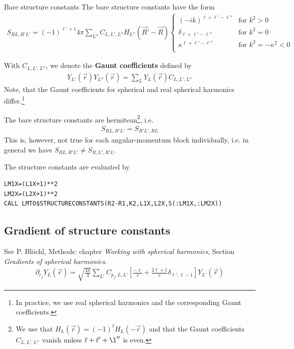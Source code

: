 \documentclass[11pt,a4paper]{report}
\begin{document}
\begin{myshadowminipage}{Bare structure constants}
The bare structure constants have the form
\begin{eqnarray}
S_{RL,R'L'}=(-1)^{\ell'+1} 4\pi \sum_{L''} C_{L,L',L''} 
H_{L''}(\vec{R}'-\vec{R})
\begin{cases}
(-ik)^{\ell+\ell'-\ell''}&\text{for $k^2>0$}\\
\delta_{\ell+\ell'-\ell''}&\text{for $k^2=0$}\\
\kappa^{\ell+\ell'-\ell''}&\text{for $k^2=-\kappa^2<0$}\\
\end{cases}
\label{eq:fortmulaforbarestructureconstants}
\end{eqnarray}
\end{myshadowminipage}

With $C_{L,L',L''}$, we denote the \textbf{Gaunt
  coefficients} defined by
\begin{eqnarray}
Y_{L'}(\vec{r})Y_{L''}(\vec{r})=\sum_L Y_{L}(\vec{r})C_{L,L',L''}
\end{eqnarray}
Note, that the Gaunt coefficients for spherical and real spherical
harmonics differ.\footnote{In practice, we use real spherical
  harmonics and the corresponding Gaunt coefficients.}

The bare structure constants are hermitean\footnote{We use that
  $H_L(\vec{r})=(-1)^\ell H_L(-\vec{r})$ and that the Gaunt
  coefficients $C_{L,L',L''}$ vanish unless $\ell+\ell'+\l''$ is
  even.}, i.e.
\begin{eqnarray}
S_{RL,R'L'}=S_{R'L',RL}
\end{eqnarray}
This is, however, not true for each angular-momentum block individually,
i.e. in general we have $S_{RL,R'L'}\neq S_{R,L',R'L}$.

The structure constants are evaluated by
\begin{verbatim}
LM1X=(L1X+1)**2
LM2X=(L2X+1)**2
CALL LMTO$STRUCTURECONSTANTS(R2-R1,K2,L1X,L2X,S(:LM1X,:LM2X))
\end{verbatim}

\subsection{Gradient of structure constants}

See P. Bl\"ochl, Methods: chapter \textit{Working with spherical harmonics},
Section \textit{Gradients of spherical harmonics}.
\begin{eqnarray}
\partial_{r_j} Y_L(\vec{r})=\sqrt{\frac{4\pi}{3}}\sum_{L'}
C_{p_j,L,L'}\left[\frac{-\ell}{r}+\frac{2\ell+1}{r}\delta_{\ell',\ell-1}
\right]Y_{L'}(\vec{r})
\end{eqnarray}
\end{document}
